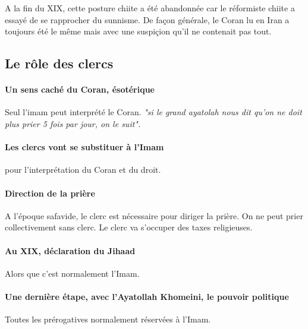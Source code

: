  A la fin du XIX, cette posture chiite a été abandonnée car le réformiste chiite a essayé de se rapprocher du sunnisme. De façon générale, le Coran lu en Iran a toujours été le même mais avec une suspiçion qu'il ne contenait pas tout.
 

 
  \subsection{Le rôle des clercs}
  
  \paragraph{Un sens caché du Coran, ésotérique} Seul l'imam peut interprété le Coran. \textit{"si le grand ayatolah nous dit qu'on ne doit plus prier 5 fois par jour, on le suit".} 
 
 \paragraph{Les clercs vont se substituer à l'Imam} pour l'interprétation du Coran et du droit. 
 
 \paragraph{Direction de la prière} A l'époque safavide, le clerc est nécessaire pour diriger la prière. On ne peut prier collectivement sans clerc. Le clerc va s'occuper des taxes religieuses.
 \paragraph{Au XIX, déclaration du Jihaad} Alors que c'est normalement l'Imam.
 
 \paragraph{Une dernière étape, avec l'Ayatollah Khomeini, le pouvoir politique} Toutes les prérogatives normalement réservées à l'Imam.
 
